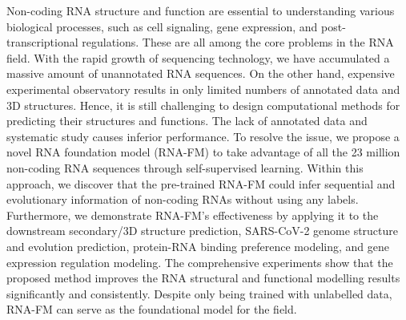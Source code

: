 Non-coding RNA structure and function are essential to understanding various biological processes, such as cell signaling, gene expression, and post-transcriptional regulations. These are all among the core problems in the RNA field.
With the rapid growth of sequencing technology, we have accumulated a massive amount of unannotated RNA sequences. On the other hand, expensive experimental observatory results in only limited numbers of annotated data and 3D structures. Hence, it is still challenging to design computational methods for predicting their structures and functions. The lack of annotated data and systematic study causes inferior performance.
To resolve the issue, we propose a novel RNA foundation model (RNA-FM) to take advantage of all the 23 million non-coding RNA sequences through self-supervised learning. Within this approach, we discover that the pre-trained RNA-FM could infer sequential and evolutionary information of non-coding RNAs without using any labels. Furthermore, we demonstrate RNA-FM's effectiveness by applying it to the downstream secondary/3D structure prediction, SARS-CoV-2 genome structure and evolution prediction, protein-RNA binding preference modeling, and gene expression regulation modeling. The comprehensive experiments show that the proposed method improves the RNA structural and functional modelling results significantly and consistently. Despite only being trained with unlabelled data, RNA-FM can serve as the foundational model for the field. 


